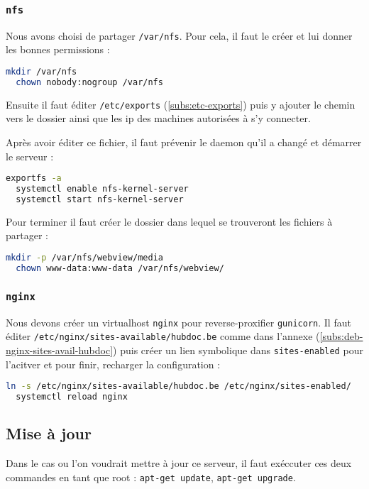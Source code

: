 \documentclass[10pt,a4paper]{article}
\begin{document}
\subsubsection{\texttt{nfs}}

Nous avons choisi de partager \texttt{/var/nfs}. Pour cela, il faut le créer et lui donner les bonnes permissions :

\begin{lstlisting}[language=bash]
  mkdir /var/nfs
  chown nobody:nogroup /var/nfs
\end{lstlisting}

Ensuite il faut éditer \texttt{/etc/exports} (\ref{subs:etc-exports}) puis y ajouter le chemin vers
le dossier ainsi que les ip des machines autorisées à s'y connecter.

Après avoir éditer ce fichier, il faut prévenir le daemon qu'il a changé et démarrer le serveur :
\begin{lstlisting}[language=bash]
  exportfs -a
  systemctl enable nfs-kernel-server
  systemctl start nfs-kernel-server
\end{lstlisting}

Pour terminer il faut créer le dossier dans lequel se trouveront les fichiers à partager :
\begin{lstlisting}[language=bash]
  mkdir -p /var/nfs/webview/media
  chown www-data:www-data /var/nfs/webview/
\end{lstlisting}

\subsubsection{\texttt{nginx}}

Nous devons créer un virtualhost \texttt{nginx} pour reverse-proxifier \texttt{gunicorn}.
Il faut éditer \texttt{/etc/nginx/sites-available/hubdoc.be} comme dans l'annexe (\ref{subs:deb-nginx-sites-avail-hubdoc})
puis créer un lien symbolique dans \texttt{sites-enabled} pour l'acitver et pour finir,
recharger la configuration :
\begin{lstlisting}[language=bash]
  ln -s /etc/nginx/sites-available/hubdoc.be /etc/nginx/sites-enabled/
  systemctl reload nginx
\end{lstlisting}

\subsection{Mise à jour}

Dans le cas ou l'on voudrait mettre à jour ce serveur,
il faut exéccuter ces deux commandes en tant que root :
\texttt{apt-get update}, \texttt{apt-get upgrade}.
\end{document}

